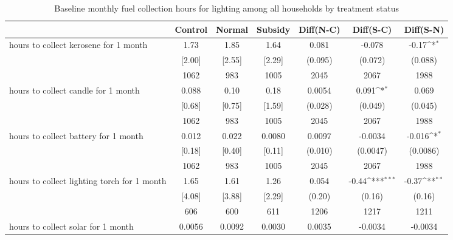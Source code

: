 \begin{table}[htbp]\centering
\def\sym#1{\ifmmode^{#1}\else\(^{#1}\)\fi}
\caption{Baseline monthly fuel collection hours for lighting among all households by treatment status \label{tab:"balance"}}
\begin{tabular*}{1\hsize}{@{\hskip\tabcolsep\extracolsep\fill}l*{1}{cccccc}}
\toprule
                                &  Control&   Normal&  Subsidy&Diff(N-C)         &Diff(S-C)         &Diff(S-N)         \\
\midrule
hours to collect kerosene for 1 month&     1.73&     1.85&     1.64&    0.081         &   -0.078         &    -0.17\sym{*}  \\
                                &   [2.00]&   [2.55]&   [2.29]&  (0.095)         &  (0.072)         &  (0.088)         \\
                                &     1062&      983&     1005&     2045         &     2067         &     1988         \\
hours to collect candle for 1 month&    0.088&     0.10&     0.18&   0.0054         &    0.091\sym{*}  &    0.069         \\
                                &   [0.68]&   [0.75]&   [1.59]&  (0.028)         &  (0.049)         &  (0.045)         \\
                                &     1062&      983&     1005&     2045         &     2067         &     1988         \\
hours to collect battery for 1 month&    0.012&    0.022&   0.0080&   0.0097         &  -0.0034         &   -0.016\sym{*}  \\
                                &   [0.18]&   [0.40]&   [0.11]&  (0.010)         & (0.0047)         & (0.0086)         \\
                                &     1062&      983&     1005&     2045         &     2067         &     1988         \\
hours to collect lighting torch for 1 month&     1.65&     1.61&     1.26&    0.054         &    -0.44\sym{***}&    -0.37\sym{**} \\
                                &   [4.08]&   [3.88]&   [2.29]&   (0.20)         &   (0.16)         &   (0.16)         \\
                                &      606&      600&      611&     1206         &     1217         &     1211         \\
hours to collect solar for 1 month&   0.0056&   0.0092&   0.0030&   0.0035         &  -0.0034         &  -0.0034         \\

\end{tabular*}
\end{table}
